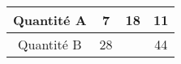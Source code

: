 \begin{tabular}{|c|c|c|c|}
\hline
Quantité A & 7 & 18 & 11 \\ \hline
Quantité B & 28 & \kern1cm & 44 \\ \hline
\end{tabular}

